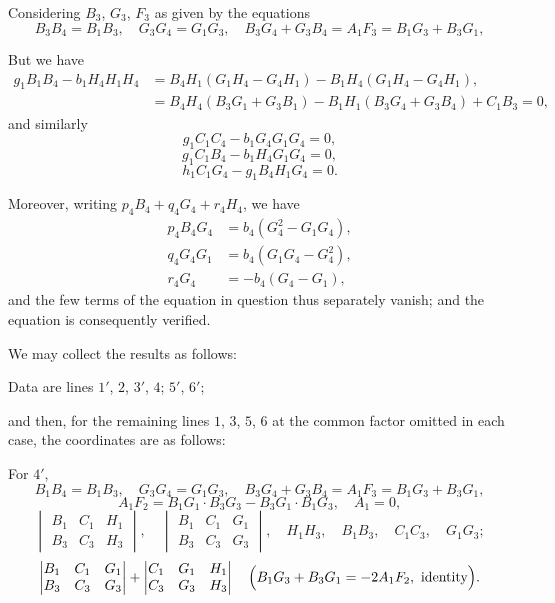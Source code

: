 \documentclass[11pt,a4paper]{article}
\begin{document}
Considering $B_3$, $G_3$, $F_3$ as given by the equations
\[
B_3 B_4 = B_1 B_3,\quad G_3 G_4 = G_1 G_3,\quad B_3 G_4 + G_3 B_4 = A_1 F_3 = B_1 G_3 + B_3 G_1,
\]
\medskip

But we have
\[
\begin{aligned}
g_1 B_1 B_4 - b_1 H_4 H_1 H_4 &= B_4 H_1 (G_1 H_4 - G_4 H_1) - B_1 H_4 (G_1 H_4 - G_4 H_1),\\
&= B_4 H_4 (B_3 G_1 + G_3 B_1) - B_1 H_1 (B_3 G_4 + G_3 B_4) + C_1 B_3 = 0,
\end{aligned}
\]
and similarly
\[
g_1 C_1 C_4 - b_1 G_4 G_1 G_4 = 0,
\]
\[
g_1 C_1 B_4 - b_1 H_4 G_1 G_4 = 0,
\]
\[
h_1 C_1 G_4 - g_1 B_4 H_1 G_4 = 0.
\]

Moreover, writing $p_4 B_4 + q_4 G_4 + r_4 H_4$, we have
\[
\begin{aligned}
p_4 B_4 G_4 &= b_4 (G_4^{2} - G_1 G_4),\\
q_4 G_4 G_1 &= b_4 (G_1 G_4 - G_4^{2}),\\
r_4 G_4 &= -b_4 (G_4 - G_1),
\end{aligned}
\]
and the few terms of the equation in question thus separately vanish; and the
equation is consequently verified.

We may collect the results as follows:

Data are lines $1'$, $2$, $3'$, $4$; $5'$, $6'$;

and then, for the remaining lines $1$, $3$, $5$, $6$ at the common factor
omitted in each case, the coordinates are as follows:

For $4'$,
\[
B_1 B_4 = B_1 B_3,\quad G_3 G_4 = G_1 G_3,\quad B_3 G_4 + G_3 B_4 = A_1 F_3 = B_1 G_3 + B_3 G_1,
\]
\[
A_1 F_2 = B_1 G_1 \cdot B_3 G_3 - B_3 G_1 \cdot B_1 G_3,\quad A_1 = 0,
\]
\[
\begin{vmatrix} B_1 & C_1 & H_1 \\ B_3 & C_3 & H_3 \end{vmatrix},\quad
\begin{vmatrix} B_1 & C_1 & G_1 \\ B_3 & C_3 & G_3 \end{vmatrix},\quad
H_1 H_3,\quad B_1 B_3,\quad C_1 C_3,\quad G_1 G_3 ;
\]
\[
\begin{vmatrix} B_1 & C_1 & G_1 \\ B_3 & C_3 & G_3 \end{vmatrix} +
\begin{vmatrix} C_1 & G_1 & H_1 \\ C_3 & G_3 & H_3 \end{vmatrix}
\quad
\Bigl( B_1 G_3 + B_3 G_1 = -2 A_1 F_2,\ \text{identity} \Bigr).
\]
\end{document}
